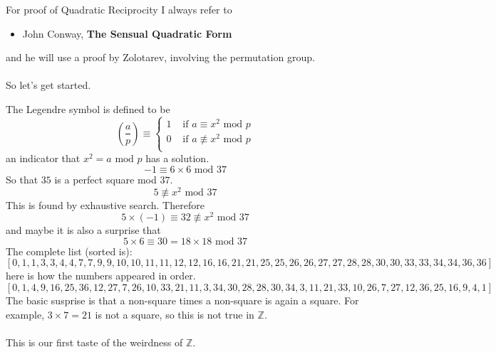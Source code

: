 \documentclass[12pt]{article}
\begin{document}
\newpage

\newpage  

\noindent For proof of Quadratic Reciprocity I always refer to
\begin{itemize}
\item John Conway, \textbf{The Sensual Quadratic Form}
\end{itemize}
and he will use a proof by Zolotarev, involving the permutation group. \\ \\
So let's get started.

\newpage

\noindent The Legendre symbol is defined to be 
$$ \left(\frac{a}{p}\right) \equiv \left\{ 
\begin{array}{cc} 
1 & \text{ if }a \equiv x^2 \text{ mod } p \\
0 & \text{ if }a \not\equiv x^2 \text{ mod } p \\
\end{array}\right. $$
an indicator that $ x^2 = a \text{ mod }p$ has a solution.
$$ -1 \equiv 6\times 6  \text{ mod }37$$
So that $35$ is a perfect square mod $37$. 
$$ 5  \not \equiv x^2 \text{ mod }37$$ 
This is found by exhaustive search.  Therefore
$$ 5 \times (-1) \equiv 32 \not \equiv x^2 \text{ mod }37 $$
and maybe it is also a surprise that 
$$ 5 \times 6 \equiv 30  = 18 \times 18 \text{ mod }37$$
The complete list (sorted is):
{\normalsize
$$[0, 1, 1, 3, 3, 4, 4, 7, 7, 9, 9, 10, 10, 11, 11, 12, 12, 16, 16, 21, 21, 25, 25, 26, 26, 27, 27, 28, 28, 30, 30, 33, 33, 34, 34, 36, 36]
 $$}
\noindent here is how the numbers appeared in order.  
{\normalsize
 $$[0, 1, 4, 9, 16, 25, 36, 12, 27, 7, 26, 10, 33, 21, 11, 3, 34, 30, 28, 28, 30, 34, 3, 11, 21, 33, 10, 26, 7, 27, 12, 36, 25, 16, 9, 4, 1]$$}
The basic susprise is that a non-square times a non-square is again a square.  For example, $3 \times 7 = 21$ is not a square, so this is not true in $\mathbb{Z}$. \\ \\
This is our first taste of the weirdness of $\mathbb{Z}$. 

\newpage
\end{document}
